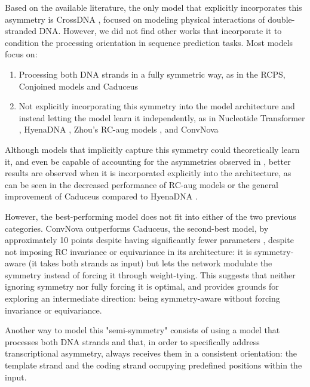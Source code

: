 \documentclass[   ]{article}
\begin{document}
Based on the available literature, the only model that explicitly
incorporates this asymmetry is CrossDNA
\citep{luoExplicitDynamicCrossStrand2026}, focused on modeling
physical interactions of double-stranded DNA. However, we did not find other works
that incorporate it to condition the processing orientation in sequence
prediction tasks. Most models focus on:
\begin{enumerate}[label=\alph*]
	\item Processing both DNA strands in
	a fully symmetric way, as in the RCPS, Conjoined models
	\citep{zhouBetterUnderstandingReverseComplement2021} and Caduceus
	\citep{schiffCaduceusBiDirectionalEquivariant2024}
	\item Not explicitly incorporating this symmetry into the model architecture and instead letting the model learn it independently, as in Nucleotide Transformer
	\citep{dalla-torreNucleotideTransformerBuilding2025}, HyenaDNA
	\citep{nguyenHyenaDNALongRangeGenomic2023}, Zhou's RC-aug models
	\citep{zhouBetterUnderstandingReverseComplement2021}, and ConvNova
	\citep{boRevisitingConvolutionArchitecture2025}
\end{enumerate}

Although models that implicitly capture this symmetry could
theoretically learn it, and even be capable of accounting for the
asymmetries observed in \citet{moeckelStrandAsymmetriesGenomic2023}, better results are observed when
it is incorporated explicitly into the architecture, as can be seen in
the decreased performance of \citet{zhouBetterUnderstandingReverseComplement2021} RC-aug models or the general
improvement of Caduceus compared to HyenaDNA
\citep{schiffCaduceusBiDirectionalEquivariant2024}.

However, the best-performing model does not fit into either of the two
previous categories. ConvNova outperforms Caduceus, the second-best
model, by approximately 10 points despite having significantly fewer
parameters \citep{boRevisitingConvolutionArchitecture2025}, despite not
imposing RC invariance or equivariance in its architecture: it is
symmetry-aware (it takes both strands as input) but lets the network
modulate the symmetry instead of forcing it through weight-tying. This
suggests that neither ignoring symmetry nor fully forcing it is optimal,
and provides grounds for exploring an intermediate direction: being
symmetry-aware without forcing invariance or equivariance.

Another way to model this "semi-symmetry" consists of using a model
that processes both DNA strands and that, in order to specifically
address transcriptional asymmetry, always receives them in a consistent
orientation: the template strand and the coding strand occupying
predefined positions within the input.
\end{document}
